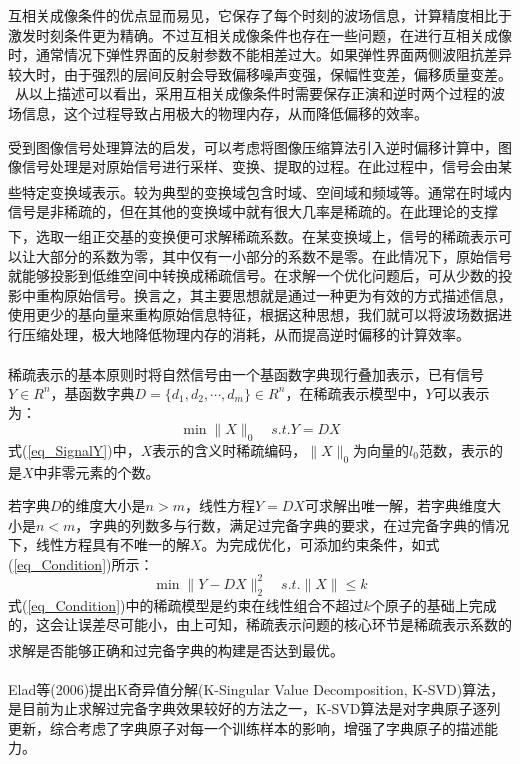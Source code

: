 \documentclass[11pt]{article}
\newcommand{\upcite}[1]{\textsuperscript{\textsuperscript{\cite{#1}}}}
\begin{document}
\par
互相关成像条件的优点显而易见，它保存了每个时刻的波场信息，计算精度相比于激发时刻条件更为精确。不过互相关成像条件也存在一些问题，在进行互相关成像时，通常情况下弹性界面的反射参数不能相差过大。如果弹性界面两侧波阻抗差异较大时，由于强烈的层间反射会导致偏移噪声变强，保幅性变差，偏移质量变差。
\
从以上描述可以看出，采用互相关成像条件时需要保存正演和逆时两个过程的波场信息，这个过程导致占用极大的物理内存，从而降低偏移的效率。
\par
受到图像信号处理算法的启发，可以考虑将图像压缩算法引入逆时偏移计算中，图像信号处理是对原始信号进行采样、变换、提取的过程。在此过程中，信号会由某些特定变换域表示\upcite{WangB2018}。较为典型的变换域包含时域、空间域和频域等。通常在时域内信号是非稀疏的，但在其他的变换域中就有很大几率是稀疏的。在此理论的支撑下，选取一组正交基的变换便可求解稀疏系数\upcite{ZhangQ2018}。在某变换域上，信号的稀疏表示可以让大部分的系数为零，其中仅有一小部分的系数不是零。在此情况下，原始信号就能够投影到低维空间中转换成稀疏信号。在求解一个优化问题后，可从少数的投影中重构原始信号。换言之，其主要思想就是通过一种更为有效的方式描述信息，使用更少的基向量来重构原始信息特征，根据这种思想，我们就可以将波场数据进行压缩处理，极大地降低物理内存的消耗，从而提高逆时偏移的计算效率。
\par
稀疏表示的基本原则时将自然信号由一个基函数字典现行叠加表示\upcite{Loxley2017}，已有信号$Y \in R^n$，基函数字典$D=\{ d_1,d_2,\cdots,d_m \} \in R^n$，在稀疏表示模型中，$Y$可以表示为：
\begin{equation}\label{eq_SignalY}
\min \parallel X \parallel_0 \quad s.t. Y=DX
\end{equation}
式(\ref{eq_SignalY})中，$X$表示的含义时稀疏编码，$\parallel X \parallel_0$为向量的$l_0$范数，表示的是$X$中非零元素的个数。
\par
若字典$D$的维度大小是$n > m$，线性方程$Y=DX$可求解出唯一解，若字典维度大小是$n < m$，字典的列数多与行数，满足过完备字典的要求，在过完备字典的情况下，线性方程具有不唯一的解$X$。为完成优化，可添加约束条件，如式(\ref{eq_Condition})所示：
\begin{equation}\label{eq_Condition}
\min \parallel Y-DX \parallel_2^2 \quad s.t. \parallel X \parallel \leq k
\end{equation}
式(\ref{eq_Condition})中的稀疏模型是约束在线性组合不超过$k$个原子的基础上完成的，这会让误差尽可能小，由上可知，稀疏表示问题的核心环节是稀疏表示系数的求解是否能够正确和过完备字典的构建是否达到最优\upcite{SunJ2017}。
\par
Elad等\upcite{Aharon2006}(2006)提出K奇异值分解(K-Singular Value Decomposition, K-SVD)算法，是目前为止求解过完备字典效果较好的方法之一，K-SVD算法是对字典原子逐列更新，综合考虑了字典原子对每一个训练样本的影响，增强了字典原子的描述能力。
\end{document}
